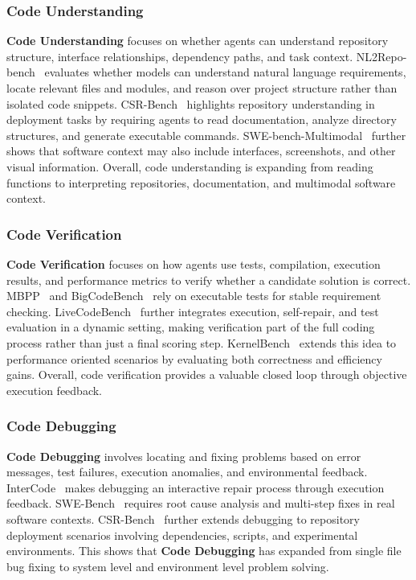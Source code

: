 \subsubsection{Code Understanding}
\label{Code Understanding}
\textbf{Code Understanding} focuses on whether agents can understand repository structure, interface relationships, dependency paths, and task context. 
NL2Repo-bench~\cite{NL2Repo_Bench} evaluates whether models can understand natural language requirements, locate relevant files and modules, and reason over project structure rather than isolated code snippets.
CSR-Bench~\cite{CSR-Bench} highlights repository understanding in deployment tasks by requiring agents to read documentation, analyze directory structures, and generate executable commands. SWE-bench-Multimodal~\cite{SWE-bench_Multimodal} further shows that software context may also include interfaces, screenshots, and other visual information. 
Overall, code understanding is expanding from reading functions to interpreting repositories, documentation, and multimodal software context.


\subsubsection{Code Verification}
\label{Code Verification}
\textbf{Code Verification} focuses on how agents use tests, compilation, execution results, and performance metrics to verify whether a candidate solution is correct. 
MBPP~\cite{MBPP} and BigCodeBench~\cite{BigCodeBench} rely on executable tests for stable requirement checking. 
LiveCodeBench~\cite{LiveCodeBench} further integrates execution, self-repair, and test evaluation in a dynamic setting, making verification part of the full coding process rather than just a final scoring step. 
KernelBench~\cite{KernelBench} extends this idea to performance oriented scenarios by evaluating both correctness and efficiency gains. 
Overall, code verification provides a valuable closed loop through objective execution feedback.



\subsubsection{Code Debugging}
\label{Code Debugging}
\textbf{Code Debugging} involves locating and fixing problems based on error messages, test failures, execution anomalies, and environmental feedback.
InterCode~\cite{InterCode} makes debugging an interactive repair process through execution feedback. 
SWE-Bench~\cite{SWE-Bench} requires root cause analysis and multi-step fixes in real software contexts. 
CSR-Bench~\cite{CSR-Bench} further extends debugging to repository deployment scenarios involving dependencies, scripts, and experimental environments. This shows that \textbf{Code Debugging} has expanded from single file bug fixing to system level and environment level problem solving.



